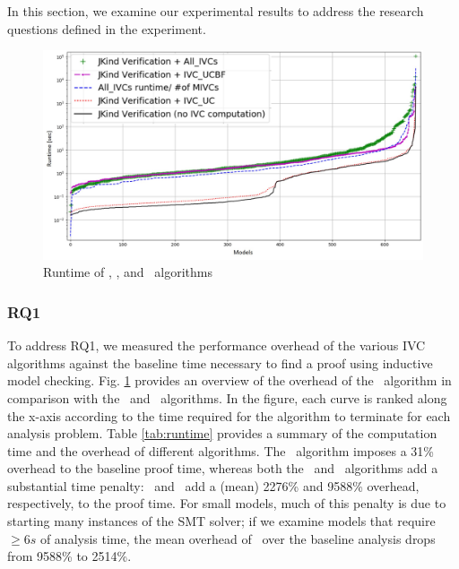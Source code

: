 \label{sec:results}

In this section, we examine our
experimental results to address the research questions defined in the experiment.

\begin{figure}
 \centering
  \includegraphics[width=\columnwidth]{figs/performance.jpg}
  \vspace{-0.1in}
  \caption{Runtime of \aivcalg, \ucbfalg, and \ucalg ~algorithms}
  \label{fig:performance}
\end{figure}


\subsubsection{RQ1}

To address RQ1, we measured the performance overhead of the various IVC algorithms against the baseline time
necessary to find a proof using inductive model checking. Fig. \ref{fig:performance} provides an overview of the  overhead of the \aivcalg ~algorithm in comparison with the \ucalg ~and \ucbfalg\ algorithms.  In the figure, each curve is ranked along the x-axis according to the time required for the algorithm to terminate for each analysis problem.
Table \ref{tab:runtime} provides a summary of the computation time and the overhead of different algorithms.  The \ucalg\ algorithm imposes a  31\% overhead to the baseline proof time, whereas both the \ucbfalg\ and \aivcalg\ algorithms add a substantial time penalty: \ucbfalg\ and \aivcalg\ add a (mean) 2276\% and 9588\% overhead, respectively, to the proof time.
For small models, much of this penalty is due to starting many instances of the SMT solver; if we examine models that require $\geq6s$ of analysis time, the mean overhead of \aivcalg\ over the baseline analysis drops from 9588\% to 2514\%.

